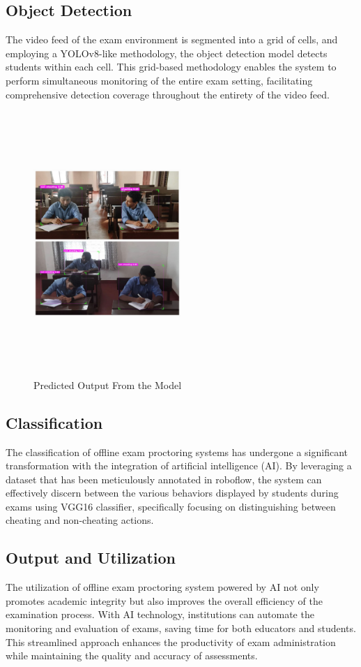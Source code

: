 \documentclass[conference]{IEEEtran}
\begin{document}
\subsection{Object Detection}
The video feed of the exam environment is segmented into a grid of cells, and employing a YOLOv8-like methodology, the object detection model detects students within each cell. This grid-based methodology enables the system to perform simultaneous monitoring of the entire exam setting, facilitating comprehensive detection coverage throughout the entirety of the video feed.

\begin{figure}[htbp]
\centering
\includegraphics[width=0.5\textwidth, height=10cm]{images/detection.jpeg}  
\caption{Predicted Output From the Model}
\label{fig}
\end{figure}


\subsection{Classification}
The classification of offline exam proctoring systems has undergone a significant transformation with the integration of artificial intelligence (AI). By leveraging a dataset that has been meticulously annotated in roboflow, the system can effectively discern between the various behaviors displayed by students during exams using VGG16 classifier, specifically focusing on distinguishing between cheating and non-cheating actions.

\subsection{Output and Utilization}
 The utilization of offline exam proctoring system powered by AI not only promotes academic integrity but also improves the overall efficiency of the examination process. With AI technology, institutions can automate the monitoring and evaluation of exams, saving time for both educators and students. This streamlined approach enhances the productivity of exam administration while maintaining the quality and accuracy of assessments.
\end{document}
